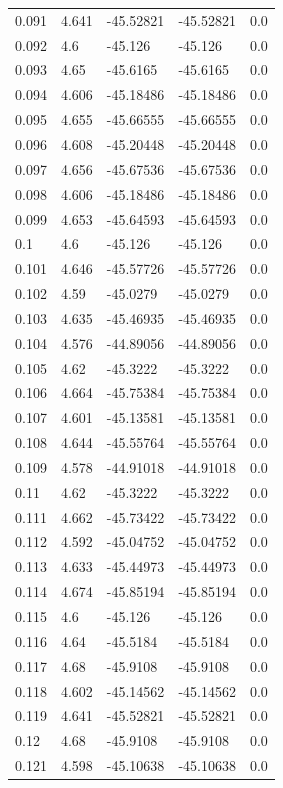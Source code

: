\begin{tabular}{lllll}
0.091 & 4.641 & -45.52821 & -45.52821 & 0.0 \\
0.092 & 4.6 & -45.126 & -45.126 & 0.0 \\
0.093 & 4.65 & -45.6165 & -45.6165 & 0.0 \\
0.094 & 4.606 & -45.18486 & -45.18486 & 0.0 \\
0.095 & 4.655 & -45.66555 & -45.66555 & 0.0 \\
0.096 & 4.608 & -45.20448 & -45.20448 & 0.0 \\
0.097 & 4.656 & -45.67536 & -45.67536 & 0.0 \\
0.098 & 4.606 & -45.18486 & -45.18486 & 0.0 \\
0.099 & 4.653 & -45.64593 & -45.64593 & 0.0 \\
0.1 & 4.6 & -45.126 & -45.126 & 0.0 \\
0.101 & 4.646 & -45.57726 & -45.57726 & 0.0 \\
0.102 & 4.59 & -45.0279 & -45.0279 & 0.0 \\
0.103 & 4.635 & -45.46935 & -45.46935 & 0.0 \\
0.104 & 4.576 & -44.89056 & -44.89056 & 0.0 \\
0.105 & 4.62 & -45.3222 & -45.3222 & 0.0 \\
0.106 & 4.664 & -45.75384 & -45.75384 & 0.0 \\
0.107 & 4.601 & -45.13581 & -45.13581 & 0.0 \\
0.108 & 4.644 & -45.55764 & -45.55764 & 0.0 \\
0.109 & 4.578 & -44.91018 & -44.91018 & 0.0 \\
0.11 & 4.62 & -45.3222 & -45.3222 & 0.0 \\
0.111 & 4.662 & -45.73422 & -45.73422 & 0.0 \\
0.112 & 4.592 & -45.04752 & -45.04752 & 0.0 \\
0.113 & 4.633 & -45.44973 & -45.44973 & 0.0 \\
0.114 & 4.674 & -45.85194 & -45.85194 & 0.0 \\
0.115 & 4.6 & -45.126 & -45.126 & 0.0 \\
0.116 & 4.64 & -45.5184 & -45.5184 & 0.0 \\
0.117 & 4.68 & -45.9108 & -45.9108 & 0.0 \\
0.118 & 4.602 & -45.14562 & -45.14562 & 0.0 \\
0.119 & 4.641 & -45.52821 & -45.52821 & 0.0 \\
0.12 & 4.68 & -45.9108 & -45.9108 & 0.0 \\
0.121 & 4.598 & -45.10638 & -45.10638 & 0.0 \\

\end{tabular}
